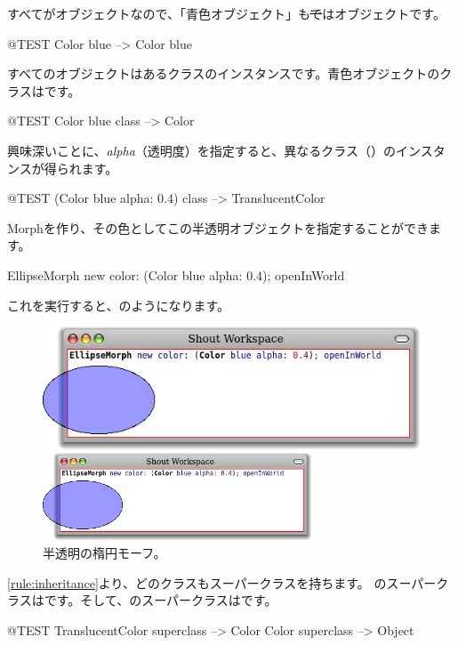 \documentclass[a4paper,10pt,twoside]{book}
\begin{document}
すべてがオブジェクトなので、「青色オブジェクト」も\st ではオブジェクトです。
\begin{code}{@TEST}
Color blue --> Color blue
\end{code}

\noindent
すべてのオブジェクトはあるクラスのインスタンスです。青色オブジェクトのクラスはです。
\begin{code}{@TEST}
Color blue class --> Color
\end{code}

\noindent
興味深いことに、\emph{alpha}（透明度）を指定すると、異なるクラス（）のインスタンスが得られます。
\begin{code}{@TEST}
(Color blue alpha: 0.4) class --> TranslucentColor
\end{code}

\noindent
Morphを作り、その色としてこの半透明オブジェクトを指定することができます。
\begin{code}{}
EllipseMorph new color: (Color blue alpha: 0.4); openInWorld
\end{code}
\noindent
これを実行すると、のようになります。

\begin{center}
\begin{figure}[!ht]
\ifluluelse
	{\centerline {\includegraphics[scale=0.7]{TranslucentEllipse}}}
	{\centerline {\includegraphics[width=8cm]{TranslucentEllipse}}}
\caption{半透明の楕円モーフ。}
\end{figure}
\end{center}

\ref{rule:inheritance}より、どのクラスもスーパークラスを持ちます。
のスーパークラスはです。そして、のスーパークラスはです。
\begin{code}{@TEST}
TranslucentColor superclass --> Color
Color superclass                   --> Object
\end{code}
\end{document}
